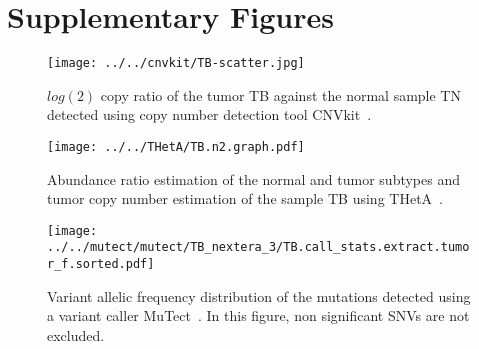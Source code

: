 \documentclass{article}
\begin{document}
\section*{Supplementary Figures}
\begin{figure}[H]
\begin{center}
  \texttt{[image: ../../cnvkit/TB-scatter.jpg]}
 \caption{$log(2)$ copy ratio of the tumor TB against the normal sample TN detected using copy number detection tool CNVkit~\cite{talevich2016cnvkit}.}
 \label{log2_cn}
\end{center}
\end{figure}

\begin{figure}[H]
\begin{center}
   \texttt{[image: ../../THetA/TB.n2.graph.pdf]}
 \caption{Abundance ratio estimation of the normal and tumor subtypes and tumor copy number estimation of the sample TB using THetA~\cite{oesper2013inferring}.}
 \label{theta_result}
\end{center}
\end{figure}

\begin{figure}[H]
\begin{center}
 \texttt{[image: ../../mutect/mutect/TB\_nextera\_3/TB.call\_stats.extract.tumor\_f.sorted.pdf]}
 \caption{Variant allelic frequency distribution of the mutations detected using a variant caller MuTect~\cite{cibulskis2013sensitive}. In this figure, non significant SNVs are not excluded.}
\end{center}
\end{figure}
\end{document}
